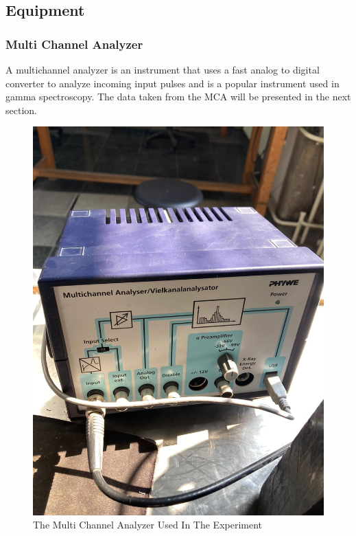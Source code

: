 	\subsection{Equipment}
		
		\subsubsection{Multi Channel Analyzer}
		A multichannel analyzer is an instrument that uses a fast analog to digital converter to analyze incoming input pulses and is a popular instrument used in gamma spectroscopy. The data taken from the MCA will be presented in the next section.
		
		\begin{figure}[h]
			\caption{The Multi Channel Analyzer Used In The Experiment}
			\centering
			\includegraphics[width=\textwidth / 2]{images/mca.jpeg}
		\end{figure}
		

